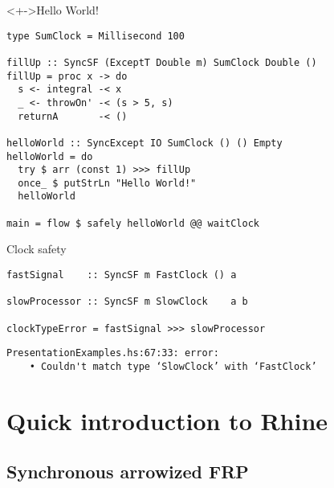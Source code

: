 \documentclass[handout]{enigtex-beamer-base}
\begin{document}
\begin{frame}[fragile]
\begin{block}<+->{Hello World!}
\begin{verbatim}
type SumClock = Millisecond 100

fillUp :: SyncSF (ExceptT Double m) SumClock Double ()
fillUp = proc x -> do
  s <- integral -< x
  _ <- throwOn' -< (s > 5, s)
  returnA       -< ()

helloWorld :: SyncExcept IO SumClock () () Empty
helloWorld = do
  try $ arr (const 1) >>> fillUp
  once_ $ putStrLn "Hello World!"
  helloWorld

main = flow $ safely helloWorld @@ waitClock
\end{verbatim}
\end{block}
\end{frame}

\begin{frame}[fragile]
\begin{block}{Clock safety}
\begin{verbatim}
fastSignal    :: SyncSF m FastClock () a

slowProcessor :: SyncSF m SlowClock    a b

clockTypeError = fastSignal >>> slowProcessor
\end{verbatim}
\end{block}
\begin{verbatim}
PresentationExamples.hs:67:33: error:
    • Couldn't match type ‘SlowClock’ with ‘FastClock’
\end{verbatim}
\end{frame}

\section{Quick introduction to Rhine}

\subsection{Synchronous arrowized FRP}
\end{document}
